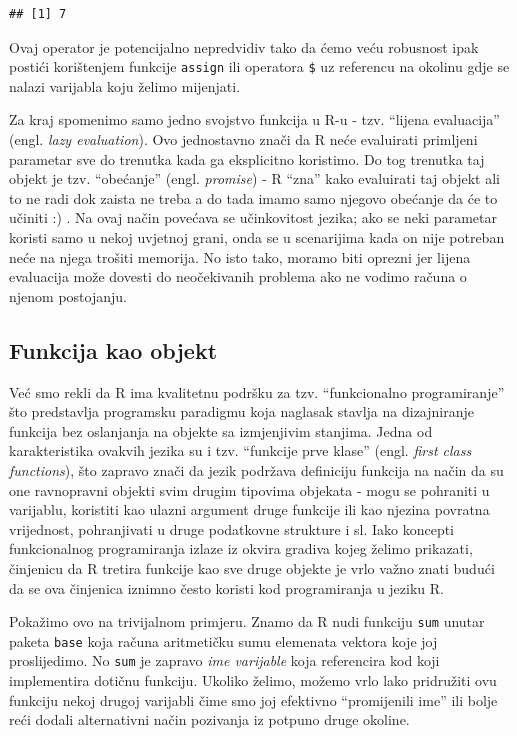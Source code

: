 \documentclass[]{book}
\theoremstyle{definition}
\theoremstyle{definition}
\theoremstyle{definition}
\theoremstyle{remark}
\begin{document}
\begin{verbatim}
## [1] 7
\end{verbatim}

Ovaj operator je potencijalno nepredvidiv tako da ćemo veću robusnost
ipak postići korištenjem funkcije \texttt{assign} ili operatora
\texttt{\$} uz referencu na okolinu gdje se nalazi varijabla koju želimo
mijenjati.

Za kraj spomenimo samo jedno svojstvo funkcija u R-u - tzv. ``lijena
evaluacija'' (engl. \emph{lazy evaluation}). Ovo jednostavno znači da R
neće evaluirati primljeni parametar sve do trenutka kada ga eksplicitno
koristimo. Do tog trenutka taj objekt je tzv. ``obećanje'' (engl.
\emph{promise}) - R ``zna'' kako evaluirati taj objekt ali to ne radi
dok zaista ne treba a do tada imamo samo njegovo obećanje da će to
učiniti :) . Na ovaj način povećava se učinkovitost jezika; ako se neki
parametar koristi samo u nekoj uvjetnoj grani, onda se u scenarijima
kada on nije potreban neće na njega trošiti memorija. No isto tako,
moramo biti oprezni jer lijena evaluacija može dovesti do neočekivanih
problema ako ne vodimo računa o njenom postojanju.

\subsection{Funkcija kao objekt}\label{funkcija-kao-objekt}

Već smo rekli da R ima kvalitetnu podršku za tzv. ``funkcionalno
programiranje'' što predstavlja programsku paradigmu koja naglasak
stavlja na dizajniranje funkcija bez oslanjanja na objekte sa
izmjenjivim stanjima. Jedna od karakteristika ovakvih jezika su i tzv.
``funkcije prve klase'' (engl. \emph{first class functions}), što
zapravo znači da jezik podržava definiciju funkcija na način da su one
ravnopravni objekti svim drugim tipovima objekata - mogu se pohraniti u
varijablu, koristiti kao ulazni argument druge funkcije ili kao njezina
povratna vrijednost, pohranjivati u druge podatkovne strukture i sl.
Iako koncepti funkcionalnog programiranja izlaze iz okvira gradiva kojeg
želimo prikazati, činjenicu da R tretira funkcije kao sve druge objekte
je vrlo važno znati budući da se ova činjenica iznimno često koristi kod
programiranja u jeziku R.

Pokažimo ovo na trivijalnom primjeru. Znamo da R nudi funkciju
\texttt{sum} unutar paketa \texttt{base} koja računa aritmetičku sumu
elemenata vektora koje joj proslijedimo. No \texttt{sum} je zapravo
\emph{ime varijable} koja referencira kod koji implementira dotičnu
funkciju. Ukoliko želimo, možemo vrlo lako pridružiti ovu funkciju nekoj
drugoj varijabli čime smo joj efektivno ``promijenili ime'' ili bolje
reći dodali alternativni način pozivanja iz potpuno druge okoline.
\end{document}
